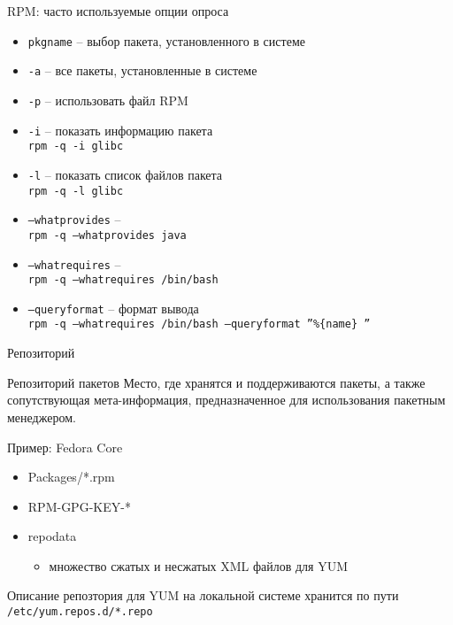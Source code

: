 \begin{frame}{RPM: часто используемые опции опроса}

	\begin{itemize}
		\item {\tt pkgname} -- выбор пакета, установленного в системе
		\item {\tt -a} -- все пакеты, установленные в системе
		\item {\tt -p} -- использовать файл RPM
	\end{itemize}


	\begin{itemize}
		\item {\tt -i} -- показать информацию пакета\\
			{\tt rpm -q -i glibc }
		\item {\tt -l} -- показать список файлов пакета \\
			{\tt rpm -q -l glibc }
		\item {\tt --whatprovides} -- \\
			{\tt rpm -q --whatprovides java}
		\item {\tt --whatrequires} -- \\
			{\tt rpm -q --whatrequires /bin/bash}
		\item {\tt --queryformat} -- формат вывода\\
			{\tt rpm -q --whatrequires /bin/bash --queryformat ''\%\{name\} ''}

	\end{itemize}

\end{frame}


\begin{frame}{Репозиторий}
	\begin{block}{Репозиторий пакетов}
		Место, где хранятся и поддерживаются пакеты, а также сопутствующая мета-информация, предназначенное для использования пакетным менеджером.
	\end{block}
	\begin{block}{Пример: Fedora Core}
		\begin{itemize}
			\item Packages/*.rpm
			\item RPM-GPG-KEY-*
			\item repodata
			\begin{itemize}
				\item множество сжатых и несжатых XML файлов для YUM
			\end{itemize}
		\end{itemize}

		Описание репозтория для YUM на локальной системе хранится по пути
		{\tt /etc/yum.repos.d/*.repo}
	\end{block}
		
\end{frame}

